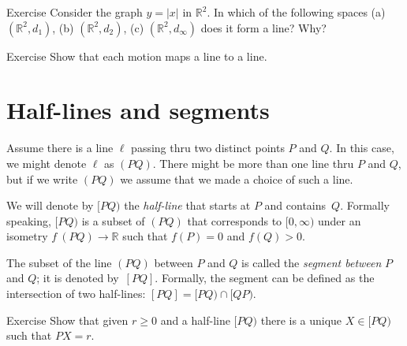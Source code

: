 \begin{thm}{Exercise}\label{ex:y=|x|}
Consider the graph $y=|x|$ in $\mathbb{R}^2$.
In which of the following spaces
(a) $(\mathbb{R}^2,d_1)$, 
(b) $(\mathbb{R}^2,d_2)$, 
(c) $(\mathbb{R}^2,d_\infty)$ 
does it form a line? 
Why?
\end{thm}

\begin{thm}[!]{Exercise}\label{ex:line-motion}
Show that each motion maps a line to a line.
\end{thm}


\section{Half-lines and segments}

Assume there is a line $\ell$ passing thru
two distinct points $P$ and $Q$.
In this case, we might denote $\ell$ as $(PQ)$.
There might be more than one line thru $P$ and $Q$,
but if we write \index{60@$(PQ)$, $[PQ)$, $[PQ]$}$(PQ)$ we assume that we made a choice of such a line. 

We will denote by $[P Q)$ the \emph{half-line}
that starts at $P$ and contains~$Q$. 
Formally speaking, $[P Q)$ is a subset of $(P Q)$ that corresponds to $[0,\infty)$ under an isometry $f\:(P Q)\to \mathbb{R}$ such that $f(P)=0$ and $f(Q)>0$.

The subset of the line $(P Q)$ between $P$ and $Q$ is called the \emph{segment between} $P$ and $Q$; it is denoted by~$[P Q]$.
Formally, the segment can be defined as the intersection of two half-lines: $[P Q]=[P Q)\cap[Q P)$.

\begin{thm}[!]{Exercise}\label{ex:trig==}
Show that given $r\ge 0$ and a half-line $[P Q)$ there is a unique $X\in [P Q)$  such that $P X=r$.

\end{thm}


